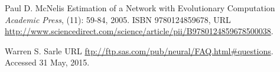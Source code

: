 \documentclass[11pt,twoside]{rmta2010esp}%
\begin{document}
\begin{thebibliography}{99}






Paul D. McNelis
\newblock Estimation of a Network with Evolutionary Computation
\newblock \emph{Academic Press},
  (11): 59-84, 2005.
\newblock ISBN 9780124859678,
\newblock URL
  \url{http://www.sciencedirect.com/science/article/pii/B9780124859678500038}.



Warren S. Sarle
\newblock URL
  \url{ftp://ftp.sas.com/pub/neural/FAQ.html#questions}.
  \newblock Accessed 31 May, 2015.












\end{thebibliography}
\end{document}
